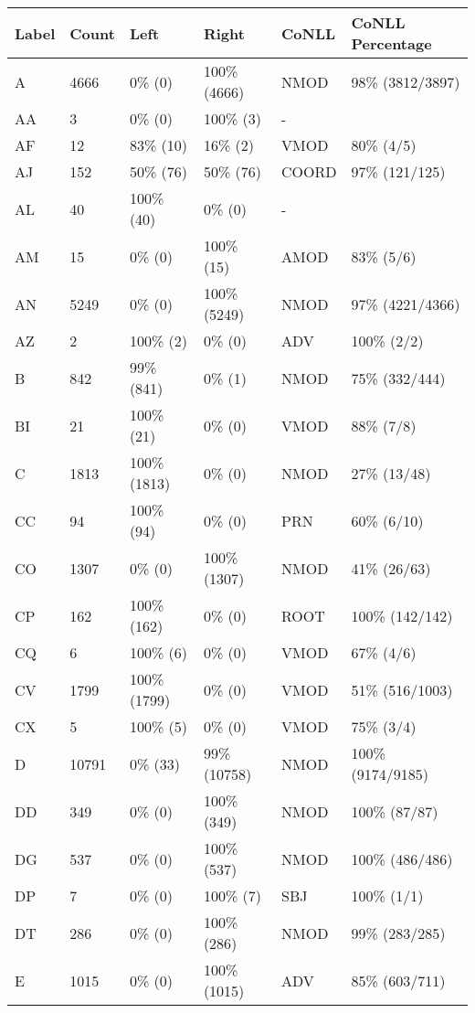 \begin{figure*}
\begin{tabular}{|l|l|l|l||l|l|}
\hline
Label & Count & Left & Right & CoNLL & CoNLL Percentage\\ 
\hline
 A & 4666 & 0\% (0) & 100\% (4666) & NMOD & 98\% (3812/3897) \\ 
\hline
 AA & 3 & 0\% (0) & 100\% (3) & - &  \\ 
\hline
 AF & 12 & 83\% (10) & 16\% (2) & VMOD & 80\% (4/5) \\ 
\hline
 AJ & 152 & 50\% (76) & 50\% (76) & COORD & 97\% (121/125) \\ 
\hline
 AL & 40 & 100\% (40) & 0\% (0) & - &  \\ 
\hline
 AM & 15 & 0\% (0) & 100\% (15) & AMOD & 83\% (5/6) \\ 
\hline
 AN & 5249 & 0\% (0) & 100\% (5249) & NMOD & 97\% (4221/4366) \\ 
\hline
 AZ & 2 & 100\% (2) & 0\% (0) & ADV & 100\% (2/2) \\ 
\hline
 B & 842 & 99\% (841) & 0\% (1) & NMOD & 75\% (332/444) \\ 
\hline
 BI & 21 & 100\% (21) & 0\% (0) & VMOD & 88\% (7/8) \\ 
\hline
 C & 1813 & 100\% (1813) & 0\% (0) & NMOD & 27\% (13/48) \\ 
\hline
 CC & 94 & 100\% (94) & 0\% (0) & PRN & 60\% (6/10) \\ 
\hline
 CO & 1307 & 0\% (0) & 100\% (1307) & NMOD & 41\% (26/63) \\ 
\hline
 CP & 162 & 100\% (162) & 0\% (0) & ROOT & 100\% (142/142) \\ 
\hline
 CQ & 6 & 100\% (6) & 0\% (0) & VMOD & 67\% (4/6) \\ 
\hline
 CV & 1799 & 100\% (1799) & 0\% (0) & VMOD & 51\% (516/1003) \\ 
\hline
 CX & 5 & 100\% (5) & 0\% (0) & VMOD & 75\% (3/4) \\ 
\hline
 D & 10791 & 0\% (33) & 99\% (10758) & NMOD & 100\% (9174/9185) \\ 
\hline
 DD & 349 & 0\% (0) & 100\% (349) & NMOD & 100\% (87/87) \\ 
\hline
 DG & 537 & 0\% (0) & 100\% (537) & NMOD & 100\% (486/486) \\ 
\hline
 DP & 7 & 0\% (0) & 100\% (7) & SBJ & 100\% (1/1) \\ 
\hline
 DT & 286 & 0\% (0) & 100\% (286) & NMOD & 99\% (283/285) \\ 
\hline
 E & 1015 & 0\% (0) & 100\% (1015) & ADV & 85\% (603/711) \\ 

\end{tabular}
\end{figure*}
